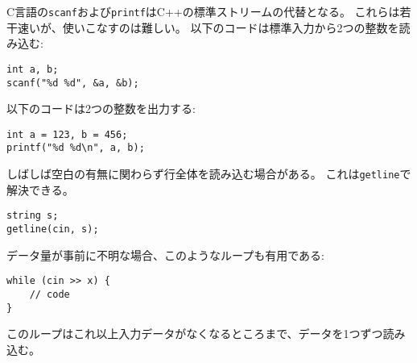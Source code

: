 C言語の\texttt{scanf}および\texttt{printf}はC++の標準ストリームの代替となる。
これらは若干速いが、使いこなすのは難しい。
以下のコードは標準入力から2つの整数を読み込む:

\begin{lstlisting}
int a, b;
scanf("%d %d", &a, &b);
\end{lstlisting}
\begin{comment}
The following code prints two integers:
\end{comment}
以下のコードは2つの整数を出力する:
\begin{lstlisting}
int a = 123, b = 456;
printf("%d %d\n", a, b);
\end{lstlisting}

\begin{comment}
Sometimes the program should read a whole line
from the input, possibly containing spaces.
This can be accomplished by using the
\texttt{getline} function:
\end{comment}

しばしば空白の有無に関わらず行全体を読み込む場合がある。
これは\texttt{getline}で解決できる。

\begin{lstlisting}
string s;
getline(cin, s);
\end{lstlisting}

\begin{comment}
If the amount of data is unknown, the following
loop is useful:
\end{comment}

データ量が事前に不明な場合、このようなループも有用である:

\begin{lstlisting}
while (cin >> x) {
    // code
}
\end{lstlisting}

\begin{comment}
This loop reads elements from the input
one after another, until there is no
more data available in the input.
\end{comment}

このループはこれ以上入力データがなくなるところまで、データを1つずつ読み込む。

\begin{comment}
In some contest systems, files are used for
input and output.
An easy solution for this is to write
the code as usual using standard streams,
but add the following lines to the beginning of the code:
\end{comment}


